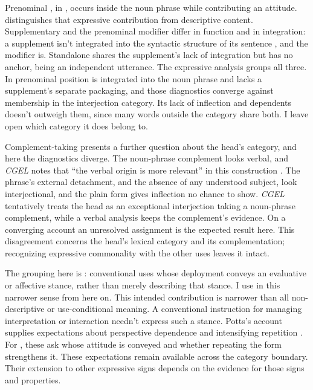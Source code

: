 \documentclass[12pt]{article}
\begin{document}
Prenominal , in , occurs inside the
noun phrase while contributing an attitude. \textcite[166, 181]{potts2007}
distinguishes that expressive contribution from descriptive content.
Supplementary  and the prenominal modifier differ in function
and in integration: a supplement isn't integrated into the syntactic
structure of its sentence \citep[1350]{HuddlestonPullum2002}, and the
modifier is. Standalone  shares the supplement's lack of
integration but has no anchor, being an independent utterance. The
expressive analysis groups all three. In prenominal position 
is integrated into the noun phrase and lacks a supplement's separate
packaging, and those diagnostics converge against membership in the
interjection category. Its lack of inflection and dependents doesn't
outweigh them, since many words outside the category share both. I leave
open which category it does belong to.

Complement-taking  presents a further
question about the head's category, and here the diagnostics diverge. The
noun-phrase complement looks verbal, and \textit{CGEL} notes that
\enquote{the verbal origin is more relevant} in this construction
\citep[1361 n.~70]{HuddlestonPullum2002}. The
phrase's external detachment, and the absence of any understood subject,
look interjectional, and the plain form gives inflection no chance to show.
\textit{CGEL} tentatively treats the head as an exceptional interjection
taking a noun-phrase complement, while a verbal analysis keeps the complement's evidence. On a converging
account an unresolved assignment is the expected result here. This disagreement concerns the head's lexical
category and its complementation; recognizing expressive commonality with
the other  uses leaves it intact.

The grouping here is : conventional uses whose
deployment conveys an evaluative or affective stance, rather than merely
describing that stance. I use  in this narrower sense from
here on. This intended contribution is narrower than
all non-descriptive or use-conditional meaning. A conventional instruction
for managing interpretation or interaction needn't express such a stance.
Potts's account supplies expectations about perspective dependence and
intensifying repetition \citep[166--167]{potts2007}. For ,
these ask whose attitude is conveyed and whether repeating the form
strengthens it. These expectations remain available across the category
boundary. Their extension to other expressive signs
depends on the evidence for those signs and properties.
\end{document}
